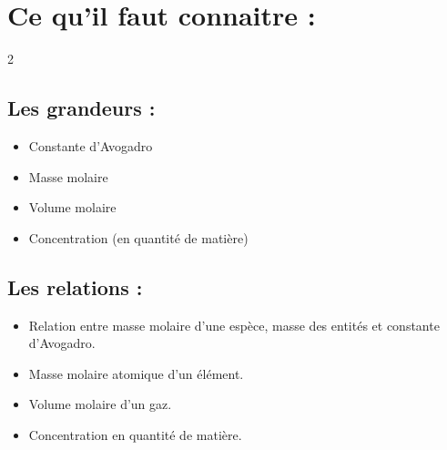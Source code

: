 \documentclass[a4paper,11pt,fleqn]{article}%
\begin{document}
	\maketitle
	
	\section*{Ce qu'il faut connaitre :}
	\begin{multicols}{2}
		\subsection*{Les grandeurs :}
		\begin{itemize}[label=$\square$]
			\item Constante d'Avogadro
			\item Masse molaire
			\item Volume molaire
			\item Concentration (en quantité de matière)
		\end{itemize}
		\subsection*{Les relations :}
		\begin{itemize}[label=$\square$]
			\item Relation entre masse molaire d’une espèce, masse des entités et constante d’Avogadro.
			\item Masse molaire atomique d’un élément.
			\item  Volume molaire d’un gaz.
			\item Concentration en quantité de matière.
		\end{itemize}
	\end{multicols}
	
\end{document}
